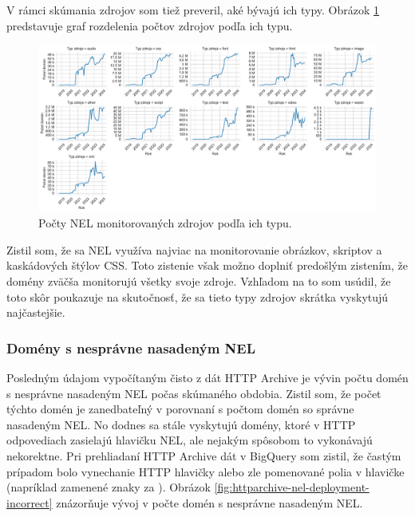 V rámci skúmania zdrojov som tiež preveril, aké bývajú ich typy.
Obrázok \ref{fig:httparchive-nel-resource-types-dist} predstavuje graf rozdelenia počtov zdrojov podľa ich typu.

\begin{figure}[!htb]
\begin{center}
 \includegraphics[scale=0.447]{obrazky-figures/httparchive_nel_resource_types_dist.pdf}
 \caption{\centering Počty NEL monitorovaných zdrojov podľa ich typu.}
 \label{fig:httparchive-nel-resource-types-dist}
\end{center}
\end{figure}

Zistil som, že sa NEL využíva najviac na monitorovanie obrázkov, skriptov a kaskádových štýlov CSS.
Toto zistenie však možno doplniť predošlým zistením, že domény zväčša monitorujú všetky svoje zdroje.
Vzhľadom na to som usúdil, že toto skôr poukazuje na skutočnosť, že sa tieto typy zdrojov skrátka vyskytujú najčastejšie.

\subsubsection{Domény s nesprávne nasadeným NEL}

Posledným údajom vypočítaným čisto z dát HTTP Archive je vývin počtu domén s nesprávne nasadeným NEL počas skúmaného obdobia.
Zistil som, že počet týchto domén je zanedbateľný v porovnaní s počtom domén so správne nasadeným NEL.
No dodnes sa stále vyskytujú domény, ktoré v HTTP odpovediach zasielajú hlavičku NEL, ale nejakým spôsobom to vykonávajú nekorektne.
Pri prehliadaní HTTP Archive dát v BigQuery som zistil, že častým prípadom bolo vynechanie HTTP hlavičky  alebo zle pomenované polia v hlavičke  (napríklad zamenené znaky  za ). 
Obrázok \ref{fig:httparchive-nel-deployment-incorrect} znázorňuje vývoj v počte domén s nesprávne nasadeným NEL.

